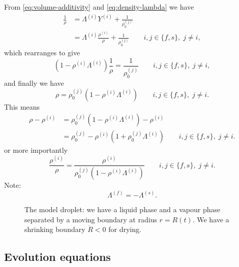 \documentclass[12pt,twoside]{report}
\begin{document}
From \eqref{eq:volume-additivity} and \eqref{eq:density-lambda} we have
\begin{equation*}
  \begin{aligned}
    \frac{1}{\rho} &=
    \Lambda^{(i)} Y^{(i)} + \frac{1}{\rho^{(j)}_0} \\
    &=
    \Lambda^{(i)} \frac{\rho^{(i)}}{\rho} + \frac{1}{\rho^{(j)}_0}
    \qquad i,j \in \{f,s\}, \; j \ne i,
  \end{aligned}
\end{equation*}
which rearranges to give
\begin{equation*}
  (1 - \rho^{(i)} \Lambda^{(i)})
  \frac{1}{\rho} =
  \frac{1}{\rho^{(j)}_0}
  \qquad i,j \in \{f,s\}, \; j \ne i,
\end{equation*}
and finally we have
\begin{equation}
  \rho =
  \rho^{(j)}_0 (1 - \rho^{(i)} \Lambda^{(i)})
  \qquad i,j \in \{f,s\}, \; j \ne i.
\end{equation}
This means
\begin{equation}
  \begin{aligned}
    \rho - \rho^{(i)} &=
    \rho^{(j)}_0 (1 - \rho^{(i)} \Lambda^{(i)}) - \rho^{(i)} \\
    &=
    \rho^{(j)}_0 - \rho^{(i)}(1 + \rho^{(j)}_0 \Lambda^{(i)})
    \qquad i,j \in \{f,s\}, \; j \ne i.
  \end{aligned}
\end{equation}
or more importantly
\begin{equation}
  \frac{\rho^{(i)}}{\rho} =
  \frac{\rho^{(i)}}{\rho^{(j)}_0 (1 - \rho^{(i)} \Lambda^{(i)})}
  \qquad i,j \in \{f,s\}, \; j \ne i.
\end{equation}
Note:
\begin{equation*}
  \Lambda^{(f)} = -\Lambda^{(s)}.
\end{equation*}

\begin{figure}
  \missingfigure[figwidth=\linewidth]{}
  \caption{The model droplet: we have a liquid phase and a vapour phase separated by a moving boundary at radius $r=R(t)$.
  We have a shrinking boundary $\dot{R} < 0$ for drying.}
\end{figure}

\subsection{Evolution equations}
\end{document}
